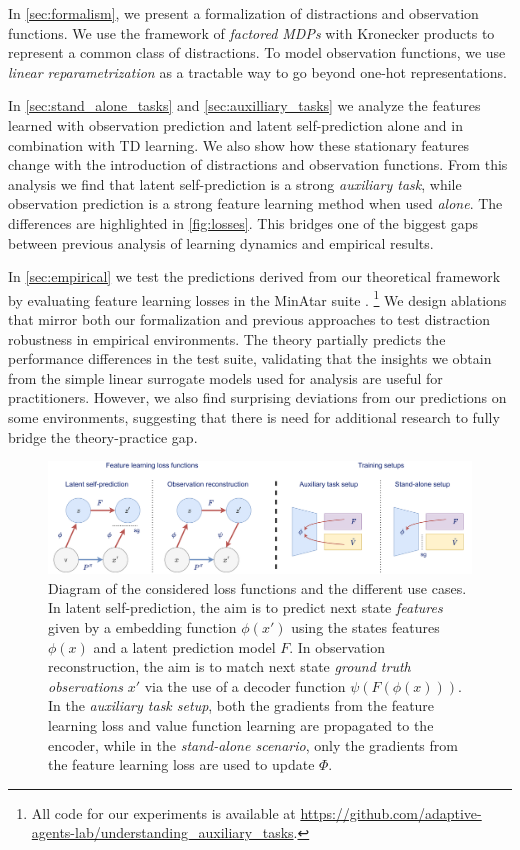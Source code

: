 In \autoref{sec:formalism}, we present a formalization of distractions and observation functions. We use the framework of \emph{factored MDPs} \parencite{boutilier2000stochastic} with Kronecker products \parencite{mahadevan2009learning} to represent a common class of distractions. To model observation functions, we use \emph{linear reparametrization} as a tractable way to go beyond one-hot representations. 

In \autoref{sec:stand_alone_tasks} and \autoref{sec:auxilliary_tasks} we analyze the features learned with observation prediction and latent self-prediction alone and in combination with TD learning. 
We also show how these stationary features change with the introduction of distractions and observation functions.
From this analysis we find that latent self-prediction is a strong \emph{auxiliary task}, while observation prediction is a strong feature learning method when used \emph{alone}.
The differences are highlighted in \autoref{fig:losses}.
This bridges one of the biggest gaps between previous analysis of learning dynamics and empirical results.

In \autoref{sec:empirical} we test the predictions derived from our theoretical framework by evaluating feature learning losses in the MinAtar suite \parencite{young19minatar}.
\footnote{All code for our experiments is available at \url{https://github.com/adaptive-agents-lab/understanding_auxiliary_tasks}.}
We design ablations that mirror both our formalization and previous approaches to test distraction robustness in empirical environments. 
The theory partially predicts the performance differences in the test suite, validating that the insights we obtain from the simple linear surrogate models used for analysis are useful for practitioners.
However, we also find surprising deviations from our predictions on some environments, suggesting that there is need for additional research to fully bridge the theory-practice gap.

\begin{figure}
    \centering
    \includegraphics[width=\textwidth]{illustrations/understanding/all_in_one_repeat.pdf}
    \caption{Diagram of the considered loss functions and the different use cases. In latent self-prediction, the aim is to predict next state \emph{features} given by a embedding function $\phi(x')$ using the states features $\phi(x)$ and a latent prediction model $F$. In observation reconstruction, the aim is to match next state \emph{ground truth observations} $x'$ via the use of a decoder function $\psi(F(\phi(x)))$. In the \emph{auxiliary task setup}, both the gradients from the feature learning loss and value function learning are propagated to the encoder, while in the \emph{stand-alone scenario}, only the gradients from the feature learning loss are used to update $\Phi$.}
    \label{fig:losses}
\end{figure}

